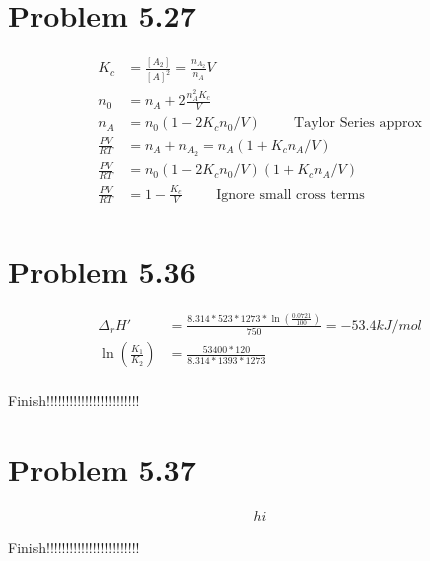 \documentclass[10pt]{article} %
\begin{document}
\section{Problem 5.27}
\begin{align*}
  K_c &= \frac{[A_2]}{[A]^2} = \frac{n_{A_2}}{n_A}V\\
  n_0 &= n_A + 2\frac{n_A^2K_c}{V}\\
  n_A &= n_0\left(1-2K_cn_0/V\right)
  \hspace{1cm} \mbox{Taylor Series approx}\\
  \frac{PV}{RT} &= n_A + n_{A_2} = n_A\left(1+K_cn_A/V\right)\\
  \frac{PV}{RT} &= n_0\left(1-2K_cn_0/V\right)\left(1+K_cn_A/V\right)\\
  \frac{PV}{RT} &= 1 - \frac{K_c}{V}
  \hspace{1cm}\mbox{Ignore small cross terms}\\
\end{align*}

\section{Problem 5.36}
\begin{align*}
  \Delta_rH' &= \frac{8.314*523*1273*\ln(\frac{0.0721}{100})}{750} = -53.4kJ/mol\\
  \ln\left(\frac{K_1}{K_2}\right) &= \frac{53400*120}{8.314*1393*1273}\\
\end{align*}

Finish!!!!!!!!!!!!!!!!!!!!!!!!

\section{Problem 5.37}
\begin{align*}
  hi
\end{align*}

Finish!!!!!!!!!!!!!!!!!!!!!!!!
\end{document}
